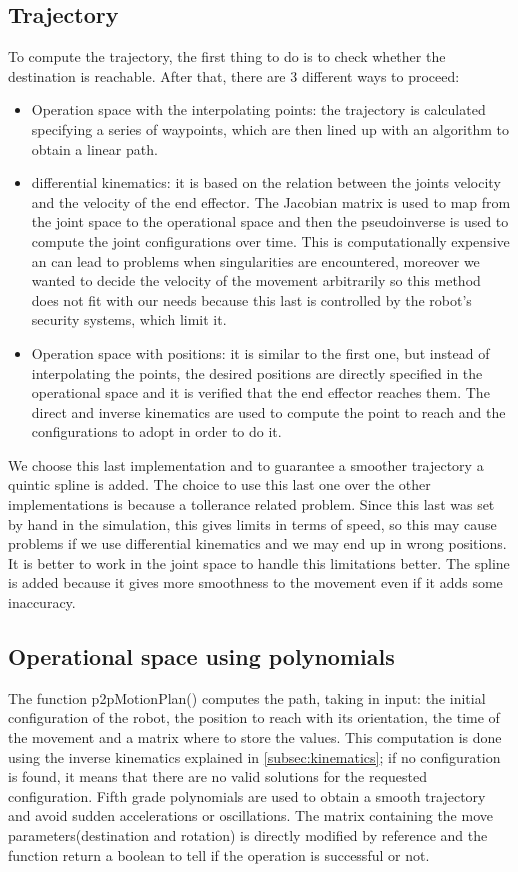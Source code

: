 \documentclass[12pt,a4paper]{article}
\begin{document}
\subsection{Trajectory}\label{subsec:trajectory}
To compute the trajectory, the first thing to do is to check whether the destination is reachable. After that, there are 3 different ways to proceed:
\begin{itemize}
    \item Operation space with the interpolating points: the trajectory is calculated specifying a series of waypoints, which are then lined up with an algorithm to obtain a linear path.
    \item differential kinematics: it is based on the relation between the joints velocity and the velocity of the end effector. The Jacobian matrix is used to map from the joint space to the operational space and then the pseudoinverse is used to compute the joint configurations over time. This is computationally expensive an can lead to problems when singularities are encountered, moreover we wanted to decide the velocity of the movement arbitrarily so this method does not fit with our needs because this last is controlled by the robot's security systems, which limit it.
    \item Operation space with positions: it is similar to the first one, but instead of interpolating the points, the desired positions are directly specified in the operational space and it is verified that the end effector reaches them. The direct and inverse kinematics are used to compute the point to reach and the configurations to adopt in order to do it. 
\end{itemize}    
We choose this last implementation and to guarantee a smoother trajectory a quintic spline is added. The choice to use this last one over the other implementations is because a tollerance related problem. Since this last was set by hand in the simulation, this gives limits in terms of speed, so this may cause problems if we use differential kinematics and we may end up in wrong positions. It is better to work in the joint space to handle this limitations better. The spline is added because it gives more smoothness to the movement even if it adds some inaccuracy.

\subsection{Operational space using polynomials}\label{subsec:opspace}
The function p2pMotionPlan() computes the path, taking in input: the initial configuration of the robot, the position to reach with its orientation, the time of the movement and a matrix where to store the values. This computation is done using the inverse kinematics explained in \ref{subsec:kinematics}; if no configuration is found, it means that there are no valid solutions for the requested configuration. Fifth grade polynomials are used to obtain a smooth trajectory and avoid sudden accelerations or oscillations. The matrix containing the move parameters(destination and rotation) is directly modified by reference and the function return a boolean to tell if the operation is successful or not.
\end{document}
